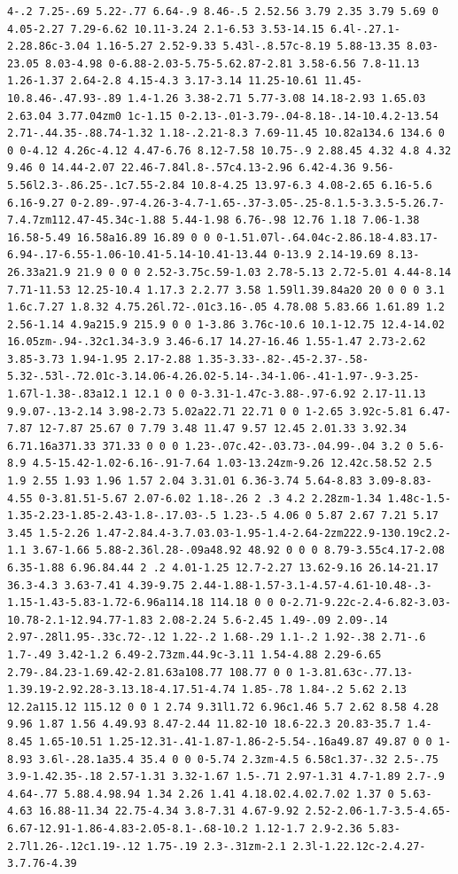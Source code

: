 \documentclass[11pt]{article}
\begin{document}
\begin{enumerate}
\begin{verbatim}
4-.2 7.25-.69 5.22-.77 6.64-.9 8.46-.5 2.52.56 3.79 2.35 3.79 5.69 0 4.05-2.27 7.29-6.62 10.11-3.24 2.1-6.53 3.53-14.15 6.4l-.27.1-2.28.86c-3.04 1.16-5.27 2.52-9.33 5.43l-.8.57c-8.19 5.88-13.35 8.03-23.05 8.03-4.98 0-6.88-2.03-5.75-5.62.87-2.81 3.58-6.56 7.8-11.13 1.26-1.37 2.64-2.8 4.15-4.3 3.17-3.14 11.25-10.61 11.45-10.8.46-.47.93-.89 1.4-1.26 3.38-2.71 5.77-3.08 14.18-2.93 1.65.03 2.63.04 3.77.04zm0 1c-1.15 0-2.13-.01-3.79-.04-8.18-.14-10.4.2-13.54 2.71-.44.35-.88.74-1.32 1.18-.2.21-8.3 7.69-11.45 10.82a134.6 134.6 0 0 0-4.12 4.26c-4.12 4.47-6.76 8.12-7.58 10.75-.9 2.88.45 4.32 4.8 4.32 9.46 0 14.44-2.07 22.46-7.84l.8-.57c4.13-2.96 6.42-4.36 9.56-5.56l2.3-.86.25-.1c7.55-2.84 10.8-4.25 13.97-6.3 4.08-2.65 6.16-5.6 6.16-9.27 0-2.89-.97-4.26-3-4.7-1.65-.37-3.05-.25-8.1.5-3.3.5-5.26.7-7.4.7zm112.47-45.34c-1.88 5.44-1.98 6.76-.98 12.76 1.18 7.06-1.38 16.58-5.49 16.58a16.89 16.89 0 0 0-1.51.07l-.64.04c-2.86.18-4.83.17-6.94-.17-6.55-1.06-10.41-5.14-10.41-13.44 0-13.9 2.14-19.69 8.13-26.33a21.9 21.9 0 0 0 2.52-3.75c.59-1.03 2.78-5.13 2.72-5.01 4.44-8.14 7.71-11.53 12.25-10.4 1.17.3 2.2.77 3.58 1.59l1.39.84a20 20 0 0 0 3.1 1.6c.7.27 1.8.32 4.75.26l.72-.01c3.16-.05 4.78.08 5.83.66 1.61.89 1.2 2.56-1.14 4.9a215.9 215.9 0 0 1-3.86 3.76c-10.6 10.1-12.75 12.4-14.02 16.05zm-.94-.32c1.34-3.9 3.46-6.17 14.27-16.46 1.55-1.47 2.73-2.62 3.85-3.73 1.94-1.95 2.17-2.88 1.35-3.33-.82-.45-2.37-.58-5.32-.53l-.72.01c-3.14.06-4.26.02-5.14-.34-1.06-.41-1.97-.9-3.25-1.67l-1.38-.83a12.1 12.1 0 0 0-3.31-1.47c-3.88-.97-6.92 2.17-11.13 9.9.07-.13-2.14 3.98-2.73 5.02a22.71 22.71 0 0 1-2.65 3.92c-5.81 6.47-7.87 12-7.87 25.67 0 7.79 3.48 11.47 9.57 12.45 2.01.33 3.92.34 6.71.16a371.33 371.33 0 0 0 1.23-.07c.42-.03.73-.04.99-.04 3.2 0 5.6-8.9 4.5-15.42-1.02-6.16-.91-7.64 1.03-13.24zm-9.26 12.42c.58.52 2.5 1.9 2.55 1.93 1.96 1.57 2.04 3.31.01 6.36-3.74 5.64-8.83 3.09-8.83-4.55 0-3.81.51-5.67 2.07-6.02 1.18-.26 2 .3 4.2 2.28zm-1.34 1.48c-1.5-1.35-2.23-1.85-2.43-1.8-.17.03-.5 1.23-.5 4.06 0 5.87 2.67 7.21 5.17 3.45 1.5-2.26 1.47-2.84.4-3.7.03.03-1.95-1.4-2.64-2zm222.9-130.19c2.2-1.1 3.67-1.66 5.88-2.36l.28-.09a48.92 48.92 0 0 0 8.79-3.55c4.17-2.08 6.35-1.88 6.96.84.44 2 .2 4.01-1.25 12.7-2.27 13.62-9.16 26.14-21.17 36.3-4.3 3.63-7.41 4.39-9.75 2.44-1.88-1.57-3.1-4.57-4.61-10.48-.3-1.15-1.43-5.83-1.72-6.96a114.18 114.18 0 0 0-2.71-9.22c-2.4-6.82-3.03-10.78-2.1-12.94.77-1.83 2.08-2.24 5.6-2.45 1.49-.09 2.09-.14 2.97-.28l1.95-.33c.72-.12 1.22-.2 1.68-.29 1.1-.2 1.92-.38 2.71-.6 1.7-.49 3.42-1.2 6.49-2.73zm.44.9c-3.11 1.54-4.88 2.29-6.65 2.79-.84.23-1.69.42-2.81.63a108.77 108.77 0 0 1-3.81.63c-.77.13-1.39.19-2.92.28-3.13.18-4.17.51-4.74 1.85-.78 1.84-.2 5.62 2.13 12.2a115.12 115.12 0 0 1 2.74 9.31l1.72 6.96c1.46 5.7 2.62 8.58 4.28 9.96 1.87 1.56 4.49.93 8.47-2.44 11.82-10 18.6-22.3 20.83-35.7 1.4-8.45 1.65-10.51 1.25-12.31-.41-1.87-1.86-2-5.54-.16a49.87 49.87 0 0 1-8.93 3.6l-.28.1a35.4 35.4 0 0 0-5.74 2.3zm-4.5 6.58c1.37-.32 2.5-.75 3.9-1.42.35-.18 2.57-1.31 3.32-1.67 1.5-.71 2.97-1.31 4.7-1.89 2.7-.9 4.64-.77 5.88.4.98.94 1.34 2.26 1.41 4.18.02.4.02.7.02 1.37 0 5.63-4.63 16.88-11.34 22.75-4.34 3.8-7.31 4.67-9.92 2.52-2.06-1.7-3.5-4.65-6.67-12.91-1.86-4.83-2.05-8.1-.68-10.2 1.12-1.7 2.9-2.36 5.83-2.7l1.26-.12c1.19-.12 1.75-.19 2.3-.31zm-2.1 2.3l-1.22.12c-2.4.27-3.7.76-4.39 
\end{verbatim}
\end{enumerate}
\end{document}
